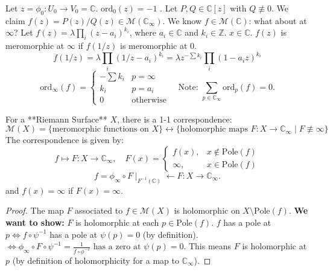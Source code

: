 \documentclass{article}
\begin{document}
\begin{example} 
Let $z=\phi_0: U_0 \to V_0 = \mathbb{C}$. $\text{ord}_0(z) = -1$ .
Let $P, Q \in \mathbb{C}[z]$ with $Q \not\equiv 0$. We claim $f(z) = P(z)/Q(z) \in \mathcal{M}(\mathbb{C}_{\infty})$.
We know $f \in \mathcal{M}(\mathbb{C})$: what about at $\infty$?
Let $f(z) = \lambda \prod_{i} (z-a_i)^{k_i}$, where $a_i \in \mathbb{C}$ and $k_i \in \mathbb{Z}$. $x \in \mathbb{C}$.
$f(z)$ is meromorphic at $\infty$ if $f(1/z)$ is meromorphic at $0$.
$$
f(1/z) =\lambda \prod_{i} (1/z - a_i)^{k_i} = \lambda z^{-\sum k_i} \prod_{i}  (1 - a_i z)^{k_i}
$$
$$
\text{ord}_{\infty}(f) =
\left\{
\begin{array}{ll}
-\sum k_i & p=\infty \\
k_i & p=a_i \\
0 & \text{otherwise}
\end{array}
\right.
\quad \text{Note: } \sum_{p \in \mathbb{C}_{\infty}} \text{ord}_p(f) = 0.
$$
\end{example}

\begin{theorem}  \label{thm:2.10}
For a **Riemann Surface** $X$, there is a 1-1 correspondence:
$$
\mathcal{M}(X) = \{ \text{meromorphic functions on } X \} \longleftrightarrow \{ \text{holomorphic maps } F: X \to \mathbb{C}_{\infty} \mid F \not \equiv \infty \}
$$
The correspondence is given by:
$$
f \longmapsto F: X \to \mathbb{C}_{\infty}, \quad F(x) =
\left\{
\begin{array}{ll}
f(x), & x \notin \text{Pole}(f) \\
\infty, & x \in \text{Pole}(f)
\end{array}
\right.
$$
$$
f = \phi_{\infty} \circ F \mid_{F^{-1}(\mathbb{C})} \longleftarrow F: X \to \mathbb{C}_{\infty}.
$$
and $f(x)=\infty$ if $F(x)=\infty$.
\end{theorem}

\begin{proof}
The map $F$ associated to $f \in \mathcal{M}(X)$ is holomorphic on $X \setminus \text{Pole}(f)$.
\textbf{We want to show:} $F$ is holomorphic at each $p \in \text{Pole}(f)$.
$f$ has a pole at $p \iff f \circ \psi^{-1}$ has a pole at $\psi(p)=0$ (by definition).\\
$\iff \phi_{\infty} \circ F \circ \psi^{-1} = \frac{1}{f \circ \phi^{-1}} \text{ has a zero at } \psi(p) = 0.$
This means $F$ is holomorphic at $p$ (by definition of holomorphicity for a map to $\mathbb{C}_{\infty}$).
\end{proof}
\end{document}
